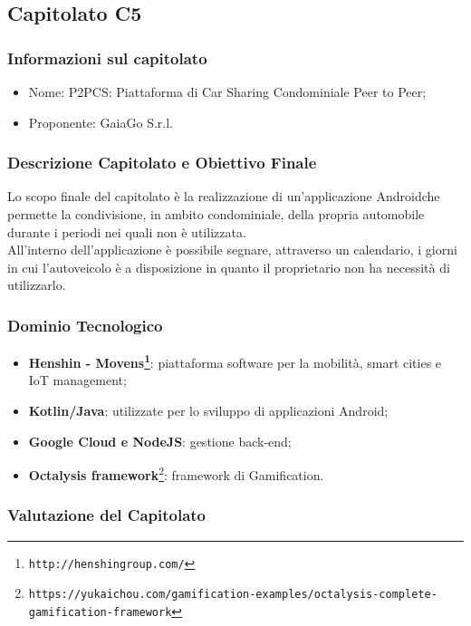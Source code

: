 \subsection{Capitolato C5}

\subsubsection{Informazioni sul capitolato}
\begin{itemize}
  \item{Nome}: P2PCS: Piattaforma di Car Sharing Condominiale Peer to Peer;
  \item{Proponente}: GaiaGo S.r.l.
\end{itemize}

\subsubsection{Descrizione Capitolato e Obiettivo Finale}
Lo scopo finale del capitolato è la realizzazione di un'applicazione Android\glossario che permette la condivisione, in ambito condominiale, della propria automobile durante i periodi nei quali non è utilizzata.\\
All'interno dell'applicazione è possibile segnare, attraverso un calendario, i giorni in cui l'autoveicolo è a disposizione in quanto il proprietario non ha necessità di utilizzarlo.

\subsubsection{Dominio Tecnologico}
\begin{itemize}
  \item \textbf{Henshin - Movens\footnote{\texttt{http://henshingroup.com/}}}: piattaforma software per la mobilità, smart cities e IoT management;
  \item \textbf{Kotlin/Java}: utilizzate per lo sviluppo di applicazioni Android;
  \item \textbf{Google Cloud e NodeJS}: gestione back-end;
  \item \textbf{Octalysis framework}\footnote{\texttt{https://yukaichou.com/gamification-examples/octalysis-complete-gamification-framework}}: framework di Gamification\glossario.
  
\end{itemize}

\subsubsection{Valutazione del Capitolato}
